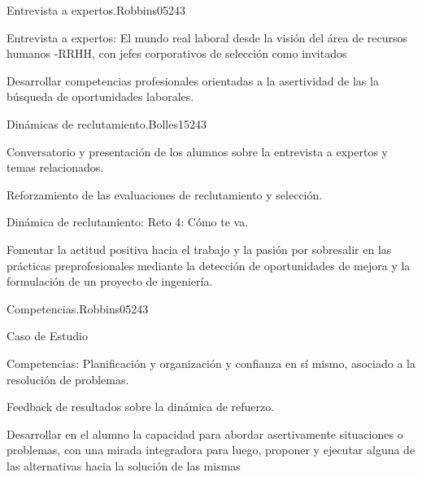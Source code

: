 \begin{syllabus}
\begin{unit}{Entrevista a expertos.}{}{Robbins05}{24}{3}
   \begin{topics}
      \item Entrevista a expertos: El mundo real laboral desde la visión del área de recursos humanos -RRHH, con jefes corporativos de selección como invitados
   \end{topics}

   \begin{learningoutcomes}
      \item Desarrollar competencias profesionales orientadas a la asertividad de las la búsqueda de oportunidades laborales.
   \end{learningoutcomes}
\end{unit}

\begin{unit}{Dinámicas de reclutamiento.}{}{Bolles15}{24}{3}
   \begin{topics}
      \item Conversatorio y presentación de los alumnos sobre la entrevista a expertos y temas relacionados.
      \item Reforzamiento de las evaluaciones de reclutamiento y selección.
      \item Dinámica de reclutamiento: Reto 4: Cómo te va.
      \end{topics}

   \begin{learningoutcomes}
      \item Fomentar la actitud positiva hacia el trabajo y la pasión por sobresalir en las prácticas preprofesionales mediante la detección de oportunidades de mejora y la formulación de un proyecto de ingeniería.
   \end{learningoutcomes}
\end{unit}

\begin{unit}{Competencias.}{}{Robbins05}{24}{3}
   \begin{topics}
      \item Caso de Estudio
      \item Competencias: Planificación y organización y confianza en sí mismo, asociado a la resolución de problemas.
      \item Feedback de resultados sobre la dinámica de refuerzo.
   \end{topics}

   \begin{learningoutcomes}
      \item Desarrollar en el alumno la capacidad para abordar asertivamente situaciones o problemas, con una mirada integradora para luego, proponer y ejecutar alguna de las alternativas hacia la solución de las mismas
   \end{learningoutcomes}
\end{unit}

\begin{coursebibliography}
\end{coursebibliography}

\end{syllabus}
